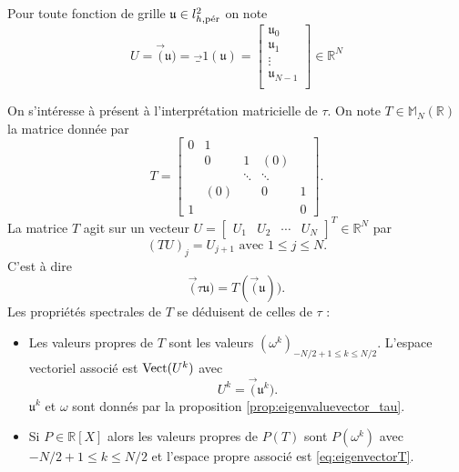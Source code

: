 Pour toute fonction de grille $\mathfrak{u} \in l^2_{h,\per}$ on note
\begin{equation}
U = \vec( \mathfrak{u} ) = \vec_1( \mathfrak{u} ) = \begin{bmatrix}
\mathfrak{u}_0\\
\mathfrak{u}_1\\
\vdots\\
\mathfrak{u}_{N-1}\\
\end{bmatrix} \in \mathbb{R}^N
\end{equation}

On s'intéresse à présent à l'interprétation matricielle de $\tau$. On note $T \in \mathbb{M}_N (\mathbb{R})$ la matrice donnée par
\begin{equation}
T = \begin{bmatrix}
0 & 1 &   &   &   \\ 
  & 0 & 1 & (0) &   \\ 
  &   & \ddots & \ddots &   \\ 
  & (0) &   & 0 & 1 \\ 
1 &   &   &   & 0
\end{bmatrix} .
\label{eq:matrice_translation}
\end{equation}
La matrice $T$ agit sur un vecteur $U = \begin{bmatrix}
U_1 & U_2 & \cdots & U_{N} 
\end{bmatrix}^T \in \mathbb{R}^N $ par
\begin{equation}
(TU)_j = U_{j+1} \text{ avec } 1 \leq j \leq N.
\end{equation}
C'est à dire
\begin{equation}
\vec ( \tau \mathfrak{u} ) = T ( \vec ( \mathfrak{u} ) ). 
\end{equation}
Les propriétés spectrales de $T$ se déduisent de celles de $\tau$ :
\begin{corollaire}
\label{cor:eigen_P(T)}
\begin{itemize}
\item Les valeurs propres de $T$ sont les valeurs $(\omega^k)_{-N/2+1 \leq k \leq N/2}$. 
L'espace vectoriel associé est $\Vect ( U^k )$ avec
\begin{equation}
U^k = \vec (\mathfrak{u}^k ).
\label{eq:eigenvectorT}
\end{equation}
$\mathfrak{u}^k$ et $\omega$ sont donnés par la proposition \ref{prop:eigenvaluevector_tau}.

\item Si $P \in \mathbb{R}[X]$ alors les valeurs propres de $P(T)$ sont $P(\omega^k)$ avec $-N/2 + 1 \leq k \leq N/2$ et l'espace propre associé est \eqref{eq:eigenvectorT}.
\end{itemize}
\end{corollaire}

